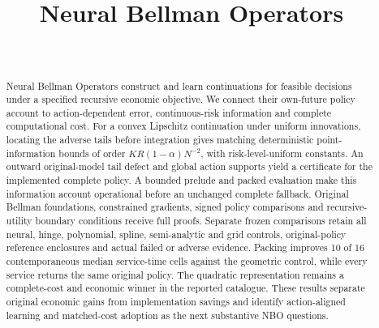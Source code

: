 \documentclass[ecta,nameyear,draft]{econsocart}
\begin{document}
\begin{frontmatter}
\title{Neural Bellman Operators}
\begin{aug}
\author[id=au1,addressref={add1}]{~}
\address[id=add1]{Peking University}
\end{aug}
\begin{abstract}
Neural Bellman Operators construct and learn continuations for feasible decisions
under a specified recursive economic objective. We connect their own-future
policy account to action-dependent error, continuous-risk information and
complete computational cost. For a convex Lipschitz continuation under uniform
innovations, locating the adverse tails before integration gives matching
deterministic point-information bounds of order $KR(1-\alpha)N^{-2}$, with
risk-level-uniform constants. An outward original-model tail defect and global
action supports yield a certificate for the implemented complete policy.
A bounded prelude and packed evaluation make this information account
operational before an unchanged complete fallback. Original Bellman foundations,
constrained gradients, signed policy comparisons and recursive-utility boundary
conditions receive full proofs. Separate frozen comparisons retain all neural,
hinge, polynomial, spline, semi-analytic and grid controls, original-policy
reference enclosures and actual failed or adverse evidence. Packing improves 10 of 16 contemporaneous median service-time cells against
the geometric control, while every service returns the same original policy.
The quadratic representation remains a complete-cost and economic winner
in the reported catalogue. These results separate original economic gains
from implementation savings and identify action-aligned learning and
matched-cost adoption as the next substantive NBO questions.
\end{abstract}
\begin{keyword}
\end{keyword}
\end{frontmatter}


















\end{document}
